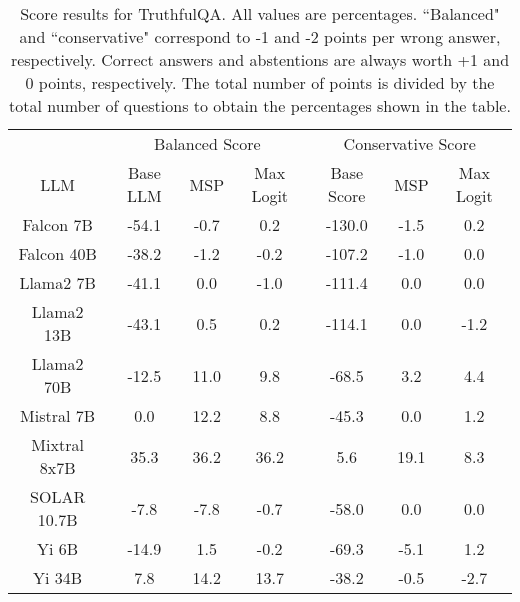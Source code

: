 \renewcommand\arraystretch{1.2}
\begin{table*}
\centering
\begin{tabular}{c|c|c|c|c|c|c}
& \multicolumn{3}{c|}{Balanced Score} & \multicolumn{3}{c}{Conservative Score} \\ 
LLM & Base LLM & MSP & Max Logit & Base Score & MSP & Max Logit\\ \hline
Falcon 7B & -54.1 & -0.7 & 0.2 & -130.0 & -1.5 & 0.2\\
Falcon 40B & -38.2 & -1.2 & -0.2 & -107.2 & -1.0 & 0.0\\
Llama2 7B & -41.1 & 0.0 & -1.0 & -111.4 & 0.0 & 0.0\\
Llama2 13B & -43.1 & 0.5 & 0.2 & -114.1 & 0.0 & -1.2\\
Llama2 70B & -12.5 & 11.0 & 9.8 & -68.5 & 3.2 & 4.4\\
Mistral 7B & 0.0 & 12.2 & 8.8 & -45.3 & 0.0 & 1.2\\
Mixtral 8x7B & 35.3 & 36.2 & 36.2 & 5.6 & 19.1 & 8.3\\
SOLAR 10.7B & -7.8 & -7.8 & -0.7 & -58.0 & 0.0 & 0.0\\
Yi 6B & -14.9 & 1.5 & -0.2 & -69.3 & -5.1 & 1.2\\
Yi 34B & 7.8 & 14.2 & 13.7 & -38.2 & -0.5 & -2.7\\
\hline
\end{tabular}
\caption{Score results for TruthfulQA. All values are percentages. ``Balanced" and ``conservative" correspond to -1 and -2 points per wrong answer, respectively. Correct answers and abstentions are always worth +1 and 0 points, respectively. The total number of points is divided by the total number of questions to obtain the percentages shown in the table.}
\label{tab:truthfulqa_score}
\end{table*}
